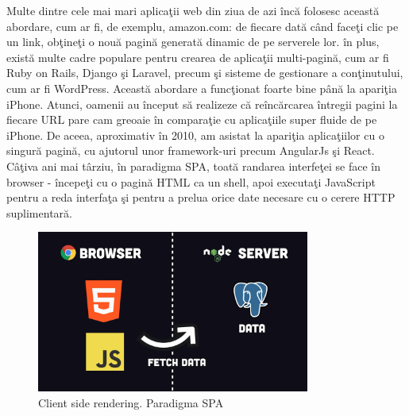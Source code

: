 \documentclass[12pt, a4paper]{report}
\begin{document}
Multe dintre cele mai mari aplica\c tii web din ziua de azi \^ inc\u a folosesc aceast\u a abordare, cum ar fi, de exemplu, amazon.com: de fiecare dat\u a c\^ and face\c ti clic pe un link, ob\c tine\c ti o nou\u a pagin\u a generat\u a dinamic de pe serverele lor. \^ in plus, exist\u a multe cadre populare pentru crearea de aplica\c tii multi-pagin\u a, cum ar fi Ruby on Rails, Django \c si Laravel, precum \c si sisteme de gestionare a con\c tinutului, cum ar fi WordPress. Aceast\u a abordare a func\c tionat foarte bine p\^ an\u a la apari\c tia iPhone. Atunci, oamenii au \^ inceput s\u a realizeze c\u a re\^ inc\u arcarea \^ intregii pagini la fiecare URL pare cam greoaie \^ in compara\c tie cu aplica\c tiile super fluide de pe iPhone. De aceea, aproximativ \^ in 2010, am asistat la apari\c tia aplica\c tiilor cu o singur\u a pagin\u a, cu ajutorul unor framework-uri precum AngularJs \c si React. C\^ a\c tiva ani mai t\^ arziu, \^ in paradigma SPA, toat\u a randarea interfe\c tei se face \^ in browser - \^ incepe\c ti cu o pagin\u a HTML ca un shell, apoi executa\c ti JavaScript pentru a reda interfa\c ta \c si pentru a prelua orice date necesare cu o cerere HTTP suplimentar\u a.

\begin{figure}[htbp]
	\centering
	\includegraphics[width=0.8\textwidth]{38.png}
	\caption{Client side rendering. Paradigma SPA}
	\label{fig:spa}
\end{figure}
\end{document}
